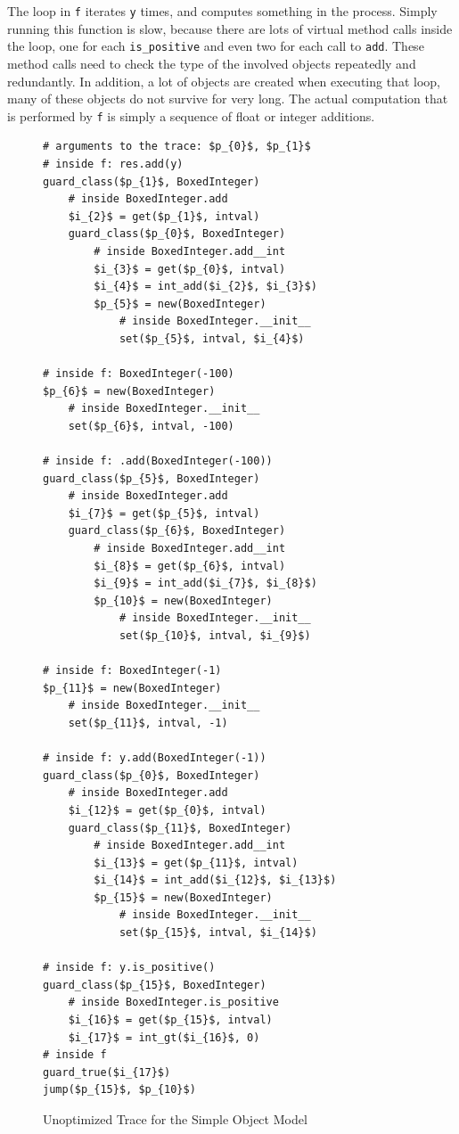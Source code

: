 \documentclass{sigplanconf}
\begin{document}
The loop in \lstinline{f} iterates \lstinline{y} times, and computes something in the process.
Simply running this function is slow, because there are lots of virtual method
calls inside the loop, one for each \lstinline{is_positive} and even two for each
call to \lstinline{add}. These method calls need to check the type of the involved
objects repeatedly and redundantly. In addition, a lot of objects are created
when executing that loop, many of these objects do not survive for very long.
The actual computation that is performed by \lstinline{f} is simply a sequence of
float or integer additions.


\begin{figure}
\begin{lstlisting}[mathescape]
# arguments to the trace: $p_{0}$, $p_{1}$
# inside f: res.add(y)
guard_class($p_{1}$, BoxedInteger)
    # inside BoxedInteger.add
    $i_{2}$ = get($p_{1}$, intval)
    guard_class($p_{0}$, BoxedInteger)
        # inside BoxedInteger.add__int
        $i_{3}$ = get($p_{0}$, intval)
        $i_{4}$ = int_add($i_{2}$, $i_{3}$)
        $p_{5}$ = new(BoxedInteger)
            # inside BoxedInteger.__init__
            set($p_{5}$, intval, $i_{4}$)

# inside f: BoxedInteger(-100) 
$p_{6}$ = new(BoxedInteger)
    # inside BoxedInteger.__init__
    set($p_{6}$, intval, -100)

# inside f: .add(BoxedInteger(-100))
guard_class($p_{5}$, BoxedInteger)
    # inside BoxedInteger.add
    $i_{7}$ = get($p_{5}$, intval)
    guard_class($p_{6}$, BoxedInteger)
        # inside BoxedInteger.add__int
        $i_{8}$ = get($p_{6}$, intval)
        $i_{9}$ = int_add($i_{7}$, $i_{8}$)
        $p_{10}$ = new(BoxedInteger)
            # inside BoxedInteger.__init__
            set($p_{10}$, intval, $i_{9}$)

# inside f: BoxedInteger(-1)
$p_{11}$ = new(BoxedInteger)
    # inside BoxedInteger.__init__
    set($p_{11}$, intval, -1)

# inside f: y.add(BoxedInteger(-1))
guard_class($p_{0}$, BoxedInteger)
    # inside BoxedInteger.add
    $i_{12}$ = get($p_{0}$, intval)
    guard_class($p_{11}$, BoxedInteger)
        # inside BoxedInteger.add__int
        $i_{13}$ = get($p_{11}$, intval)
        $i_{14}$ = int_add($i_{12}$, $i_{13}$)
        $p_{15}$ = new(BoxedInteger)
            # inside BoxedInteger.__init__
            set($p_{15}$, intval, $i_{14}$)

# inside f: y.is_positive()
guard_class($p_{15}$, BoxedInteger)
    # inside BoxedInteger.is_positive
    $i_{16}$ = get($p_{15}$, intval)
    $i_{17}$ = int_gt($i_{16}$, 0)
# inside f
guard_true($i_{17}$)
jump($p_{15}$, $p_{10}$)
\end{lstlisting}
\caption{Unoptimized Trace for the Simple Object Model}
\label{fig:unopt-trace}
\end{figure}
\end{document}
